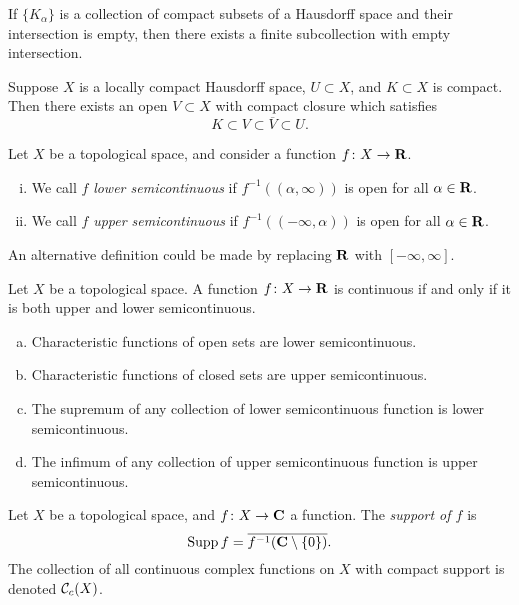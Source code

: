 \begin{theorem}
  If $\{K_\alpha\}$ is a collection of compact subsets of a Hausdorff space and their intersection is empty, then there exists a finite subcollection with empty intersection.
\end{theorem}

\begin{theorem}
  Suppose $X$ is a locally compact Hausdorff space, $U \subset X$, and $K \subset X$ is compact. Then there exists an open $V \subset X$ with compact closure which satisfies
  \[
  K \subset V \subset \overline{V} \subset U.
  \]
\end{theorem}

\begin{definition}
  Let $X$ be a topological space, and consider a function $f \colon X \rightarrow \mathbf{R}$.
  \begin{enumerate}[(i)]
  \item We call $f$ \emph{lower semicontinuous} if $f^{-1}((\alpha,\infty))$ is open for all $\alpha \in \mathbf{R}$.
  \item We call $f$ \emph{upper semicontinuous} if $f^{-1}((-\infty,\alpha))$ is open for all $\alpha \in \mathbf{R}$.
  \end{enumerate}
  An alternative definition could be made by replacing $\mathbf{R}$ with $[-\infty,\infty]$.
\end{definition}

\begin{proposition}
  Let $X$ be a topological space. A function $f \colon X \rightarrow \mathbf{R}$ is continuous if and only if it is both upper and lower semicontinuous.
\end{proposition}

\begin{example}
  \mbox{}
  \begin{enumerate}[(a)]
  \item Characteristic functions of open sets are lower semicontinuous.
  \item Characteristic functions of closed sets are upper semicontinuous.
  \item The supremum of any collection of lower semicontinuous function is lower semicontinuous.
  \item The infimum of any collection of upper semicontinuous function is upper semicontinuous.
  \end{enumerate}
\end{example}

\begin{definition}
  Let $X$ be a topological space, and $f \colon X \rightarrow \mathbf{C}$ a function. The \emph{support of $f$} is
  \[
  \operatorname{Supp} f = \overline{f^{-1}(\mathbf{C} \setminus \{0\})}.
  \]
  The collection of all continuous complex functions on $X$ with compact support is denoted $\mathcal{C}_c(X)$.
\end{definition}

